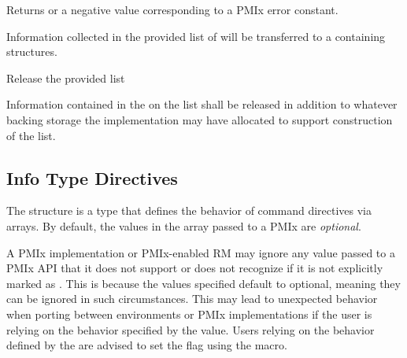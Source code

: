 \begin{arglist}
\end{arglist}

Returns  or a negative value corresponding to a PMIx error constant.

\descr

Information collected in the provided list of  will be transferred to a  containing  structures.



\summary

Release the provided  list

\format



\begin{arglist}
\end{arglist}

\descr

Information contained in the  on the list shall be released in addition to whatever backing storage the implementation may have allocated to support construction of the list.


\subsection{Info Type Directives}
\label{api:struct:infodirs}

The  structure is a  type that defines the behavior of command directives via  arrays.
By default, the values in the  array passed to a PMIx are \emph{optional}.

\adviceuserstart
A PMIx implementation or PMIx-enabled \ac{RM} may ignore any  value passed to a \ac{PMIx} \ac{API} that it does not support or does not recognize if it is not explicitly marked as .
This is because the values specified default to optional, meaning they can be ignored in such circumstances.
This may lead to unexpected behavior when porting between environments or \ac{PMIx} implementations if the user is relying on the behavior specified by the  value.
Users relying on the behavior defined by the  are advised to set the  flag using the  macro.
\adviceuserend

